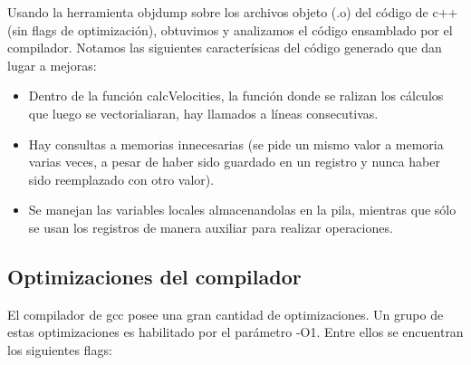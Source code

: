 Usando la herramienta objdump sobre los archivos objeto (.o) del código de c++ (sin flags de optimización), obtuvimos y analizamos el código ensamblado por el compilador. Notamos las siguientes caracterísicas del código generado que dan lugar a mejoras:
\begin{itemize}
	\item Dentro de la función calcVelocities, la función donde se ralizan los cálculos que luego se vectorialiaran, hay llamados a líneas consecutivas.
	\item Hay consultas a memorias innecesarias (se pide un mismo valor a memoria varias veces, a pesar de haber sido guardado en un registro y nunca haber sido reemplazado con otro valor).
	\item Se manejan las variables locales almacenandolas en la pila, mientras que sólo se usan los registros de manera auxiliar para realizar operaciones.
\end{itemize}


\subsection{Optimizaciones del compilador}

El compilador de gcc posee una gran cantidad de optimizaciones. Un grupo de estas optimizaciones es habilitado por el parámetro -O1. Entre ellos se encuentran los siguientes flags:



    

            

